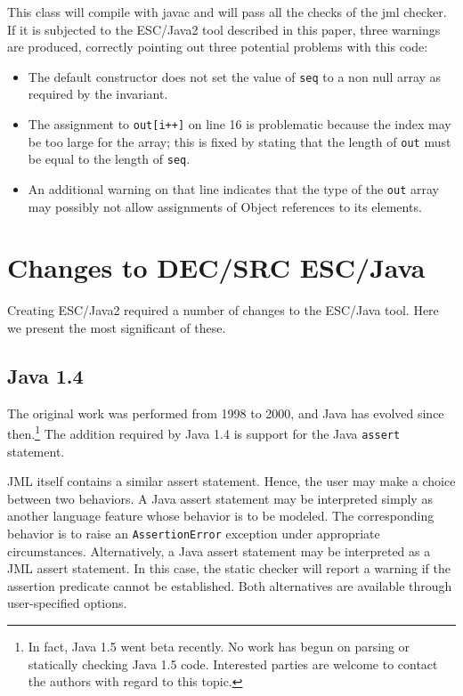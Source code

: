 \documentclass{llncs}
\begin{document}
This class will compile with javac and will pass all the checks of the
jml checker.  If it is subjected to the ESC/Java2 tool described in
this paper, three warnings are produced, correctly pointing out three
potential problems with this code:
\begin{itemize}
\item The default constructor does not set the value of \texttt{seq}
to a non null array as required by the invariant.
\item The assignment to \texttt{out[i++]} on line 16 is problematic
because the index may be too large for the array; this is fixed by
stating that the length of \texttt{out} must be equal to the length of
\texttt{seq}.
\item An additional warning on that line indicates that the type of
the \texttt{out} array may possibly not allow assignments of Object
references to its elements.
\end{itemize}
\section{Changes to DEC/SRC ESC/Java}

Creating ESC/Java2 required a number of changes to the ESC/Java tool.
Here we present the most significant of these.

\subsection{Java 1.4}

The original work was performed from 1998 to 2000, and Java has
evolved since then.\footnote{In fact, Java 1.5 went beta recently.  No
  work has begun on parsing or statically checking Java 1.5 code.
  Interested parties are welcome to contact the authors with regard to
  this topic.}  The addition required by Java 1.4 is support for the
Java {\tt assert} statement.

JML itself contains a similar assert statement.  Hence, the user may
make a choice between two behaviors.  A Java assert statement may be
interpreted simply as another language feature whose behavior is to be
modeled.  The corresponding behavior is to raise an
\texttt{AssertionError} exception under appropriate circumstances.
Alternatively, a Java assert statement may be interpreted as a JML
assert statement.  In this case, the static checker will report a
warning if the assertion predicate cannot be established.  Both
alternatives are available through user-specified options.
\end{document}
